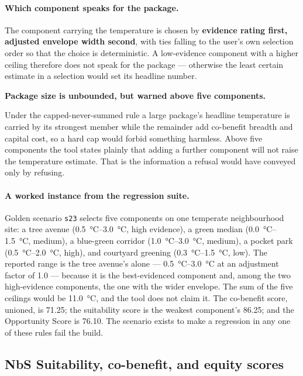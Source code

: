 \paragraph{Which component speaks for the package.} The component carrying the
temperature is chosen by \textbf{evidence rating first, adjusted envelope width
second}, with ties falling to the user's own selection order so that the choice
is deterministic. A low-evidence component with a higher ceiling therefore does
not speak for the package --- otherwise the least certain estimate in a
selection would set its headline number.

\begin{keynote}
\noindent\textbf{Package size is unbounded, but warned above five components.}

Under the capped-never-summed rule a large package's headline temperature is
carried by its strongest member while the remainder add co-benefit breadth and
capital cost, so a hard cap would forbid something harmless. Above five
components the tool states plainly that adding a further component will not
raise the temperature estimate. That is the information a refusal would have
conveyed only by refusing.
\end{keynote}

\paragraph{A worked instance from the regression suite.} Golden scenario
\texttt{s23} selects five components on one temperate neighbourhood site: a
tree avenue (\SIrange{0.5}{3.0}{\degreeCelsius}, high evidence), a green median
(\SIrange{0.0}{1.5}{\degreeCelsius}, medium), a blue-green corridor
(\SIrange{1.0}{3.0}{\degreeCelsius}, medium), a pocket park
(\SIrange{0.5}{2.0}{\degreeCelsius}, high), and courtyard greening
(\SIrange{0.3}{1.5}{\degreeCelsius}, low). The reported range is the tree
avenue's alone --- \SIrange{0.5}{3.0}{\degreeCelsius} at an adjustment factor of
\num{1.0} --- because it is the best-evidenced component and, among the two
high-evidence components, the one with the wider envelope. The sum of the five
ceilings would be \qty{11.0}{\degreeCelsius}, and the tool does not claim it.
The co-benefit score, unioned, is \num{71.25}; the suitability score is the
weakest component's \num{86.25}; and the Opportunity Score is \num{76.10}. The
scenario exists to make a regression in any one of these rules fail the build.

\subsection{NbS Suitability, co-benefit, and equity scores}
\label{sec:composite-subscores}

